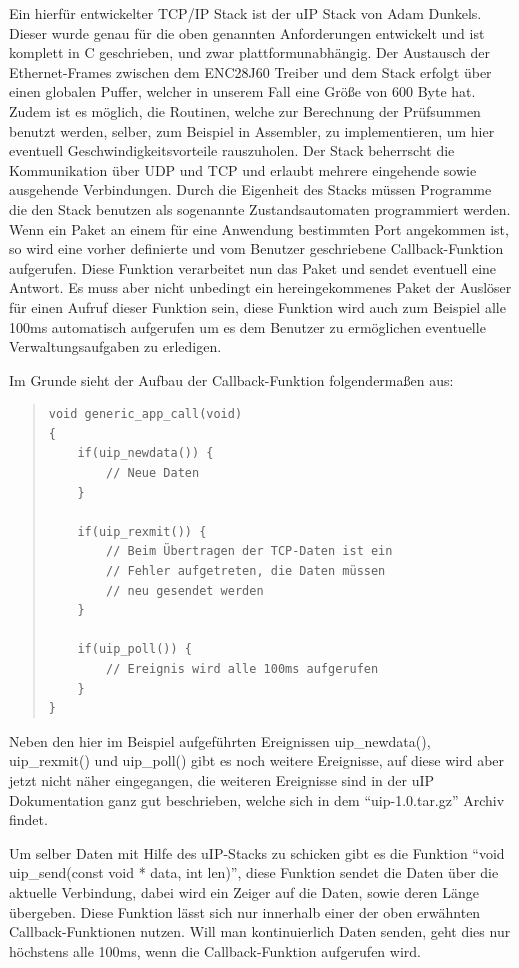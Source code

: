 \documentclass[a4paper,14pt,headsepline]{scrartcl}
\begin{document}
Ein hierfür entwickelter TCP/IP Stack ist der uIP Stack von Adam Dunkels. Dieser wurde genau für die oben genannten Anforderungen entwickelt und ist komplett in C geschrieben, und zwar plattformunabhängig. Der Austausch der Ethernet-Frames zwischen dem ENC28J60 Treiber und dem Stack erfolgt über einen globalen Puffer, welcher in unserem Fall eine Größe von 600 Byte hat. Zudem ist es möglich, die Routinen, welche zur Berechnung der Prüfsummen benutzt werden, selber, zum Beispiel in Assembler, zu implementieren, um hier eventuell Geschwindigkeitsvorteile rauszuholen. Der Stack beherrscht die Kommunikation über UDP und TCP und erlaubt mehrere eingehende sowie ausgehende Verbindungen. Durch die Eigenheit des Stacks müssen Programme die den Stack benutzen als sogenannte Zustandsautomaten programmiert werden. Wenn ein Paket an einem für eine Anwendung bestimmten Port angekommen ist, so wird eine vorher definierte und vom Benutzer geschriebene Callback-Funktion aufgerufen. Diese Funktion verarbeitet nun das Paket und sendet eventuell eine Antwort. Es muss aber nicht unbedingt ein hereingekommenes Paket der Auslöser für einen Aufruf dieser Funktion sein, diese Funktion wird auch zum Beispiel alle 100ms automatisch aufgerufen um es dem Benutzer zu ermöglichen eventuelle Verwaltungsaufgaben zu erledigen.

Im Grunde sieht der Aufbau der Callback-Funktion folgendermaßen aus:
\begin{quote}
\begin{verbatim}
void generic_app_call(void)
{
    if(uip_newdata()) {
        // Neue Daten
    }
    
    if(uip_rexmit()) {
        // Beim Übertragen der TCP-Daten ist ein
        // Fehler aufgetreten, die Daten müssen
        // neu gesendet werden
    }
    
    if(uip_poll()) {
        // Ereignis wird alle 100ms aufgerufen
    }
}
\end{verbatim}
\end{quote}

\newpage

Neben den hier im Beispiel aufgeführten Ereignissen uip\_newdata(), uip\_rexmit() und uip\_poll() gibt es noch weitere Ereignisse, auf diese wird aber jetzt nicht näher eingegangen, die weiteren Ereignisse sind in der uIP Dokumentation ganz gut beschrieben, welche sich in dem "`uip-1.0.tar.gz"' Archiv findet.

Um selber Daten mit Hilfe des uIP-Stacks zu schicken gibt es die Funktion "`void uip\_send(const void * data, int len)"', diese Funktion sendet die Daten über die aktuelle Verbindung, dabei wird ein Zeiger auf die Daten, sowie deren Länge übergeben. Diese Funktion lässt sich nur innerhalb einer der oben erwähnten Callback-Funktionen nutzen. Will man kontinuierlich Daten senden, geht dies nur höchstens alle 100ms, wenn die Callback-Funktion aufgerufen wird.
\end{document}
